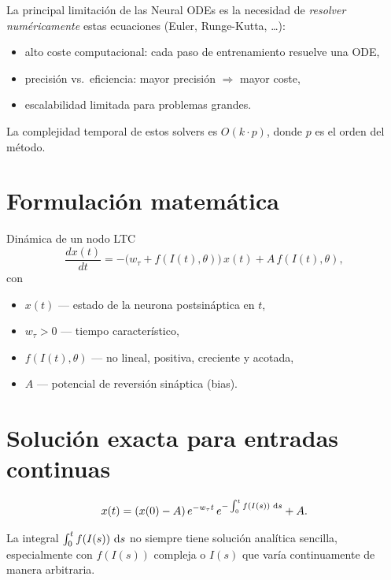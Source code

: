 \documentclass{claudeeditorial}
\begin{document}
\begin{ClaudeWarning}
La principal limitación de las Neural ODEs es la necesidad de \emph{resolver numéricamente} estas ecuaciones (Euler, Runge-Kutta, …):
\begin{itemize}[leftmargin=1.2em,nosep]
\item alto coste computacional: cada paso de entrenamiento resuelve una ODE,
\item precisión vs.\ eficiencia: mayor precisión $\Rightarrow$ mayor coste,
\item escalabilidad limitada para problemas grandes.
\end{itemize}
La complejidad temporal de estos solvers es $O(k\cdot p)$, donde $p$ es el orden del método.
\end{ClaudeWarning}


\section{Formulación matemática}

\begin{ClaudeCard}{Dinámica de un nodo LTC}
\[
  \frac{dx(t)}{dt} = -\bigl(w_\tau + f(I(t),\theta)\bigr)\,x(t) + A\,f(I(t),\theta),
\]
con
\begin{itemize}[leftmargin=1.2em,nosep]
\item $x(t)$ — estado de la neurona postsináptica en $t$,
\item $w_\tau > 0$ — tiempo característico,
\item $f(I(t),\theta)$ — no lineal, positiva, creciente y acotada,
\item $A$ — potencial de reversión sináptica (bias).
\end{itemize}
\end{ClaudeCard}

\section{Solución exacta para entradas continuas}

\[
  x(t) = (x(0)-A)\,e^{-w_\tau t}\,e^{-\int_0^t f(I(s))\,\mathop{}\!\mathrm{d} s} + A.
\]

\begin{ClaudeInfo}
La integral $\int_0^t f(I(s))\,\mathop{}\!\mathrm{d} s$ no siempre tiene solución analítica sencilla, especialmente con $f(I(s))$ compleja o $I(s)$ que varía continuamente de manera arbitraria. 
\end{ClaudeInfo}
\end{document}
